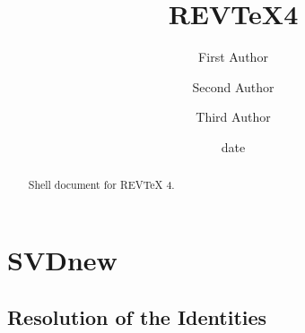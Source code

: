\documentclass[aps,preprint]{revtex4}%
\begin{document}
\title[Short title for running header]{REV\TeX4}
\author{First Author}
\author{Second Author}
\author{Third Author}

\begin{abstract}
Shell document for REV\TeX{} 4.

\end{abstract}
\date[Date text]{date}




\maketitle
\tableofcontents


\section{SVDnew}

\subsection{Resolution of the Identities}
\end{document}

